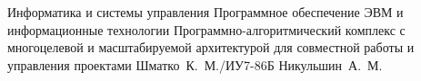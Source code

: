 \documentclass{bmstu}
\begin{document}
\makethesistitle
    {Информатика и системы управления} %
    {Программное обеспечение ЭВМ и информационные технологии} %
    {Программно-алгоритмический комплекс с многоцелевой и масштабируемой архитектурой для совместной работы и управления проектами} %
    {Шматко~К.~М./ИУ7-86Б} %
    {Никульшин~А.~М.} %
    {} %
    {} %



\maketableofcontents











\makebibliography


\end{document}
